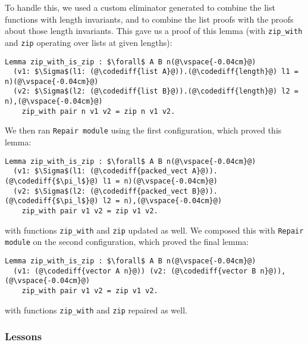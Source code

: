 To handle this, we used a custom eliminator \toolname generated to combine the list functions
with length invariants, and to combine the list proofs with the proofs about those length invariants.
This gave us a proof of this lemma (with \lstinline{zip_with} and \lstinline{zip} operating over lists at given lengths):

\begin{lstlisting}
Lemma zip_with_is_zip : $\forall$ A B n(@\vspace{-0.04cm}@)
  (v1: $\Sigma$(l1: (@\codediff{list A}@)).(@\codediff{length}@) l1 = n)(@\vspace{-0.04cm}@)
  (v2: $\Sigma$(l2: (@\codediff{list B}@)).(@\codediff{length}@) l2 = n),(@\vspace{-0.04cm}@)
    zip_with pair n v1 v2 = zip n v1 v2.
\end{lstlisting}
We then ran \lstinline{Repair module} using the first
configuration, which proved this lemma:

\begin{lstlisting}[backgroundcolor=\color{cyan!30}]
Lemma zip_with_is_zip : $\forall$ A B n(@\vspace{-0.04cm}@)
  (v1: $\Sigma$(l1: (@\codediff{packed_vect A}@)).(@\codediff{$\pi_l$}@) l1 = n)(@\vspace{-0.04cm}@)
  (v2: $\Sigma$(l2: (@\codediff{packed_vect B}@)).(@\codediff{$\pi_l$}@) l2 = n),(@\vspace{-0.04cm}@)
    zip_with pair v1 v2 = zip v1 v2.
\end{lstlisting}
with functions \lstinline{zip_with} and \lstinline{zip} updated as well.
We composed this with \lstinline{Repair module} on the second configuration,
which proved the final lemma:

\begin{lstlisting}[backgroundcolor=\color{cyan!30}]
Lemma zip_with_is_zip : $\forall$ A B n(@\vspace{-0.04cm}@)
  (v1: (@\codediff{vector A n}@)) (v2: (@\codediff{vector B n}@)),(@\vspace{-0.04cm}@)
    zip_with pair v1 v2 = zip v1 v2.
\end{lstlisting}
with functions \lstinline{zip_with} and \lstinline{zip} repaired as well.

\subsubsection{Lessons}

